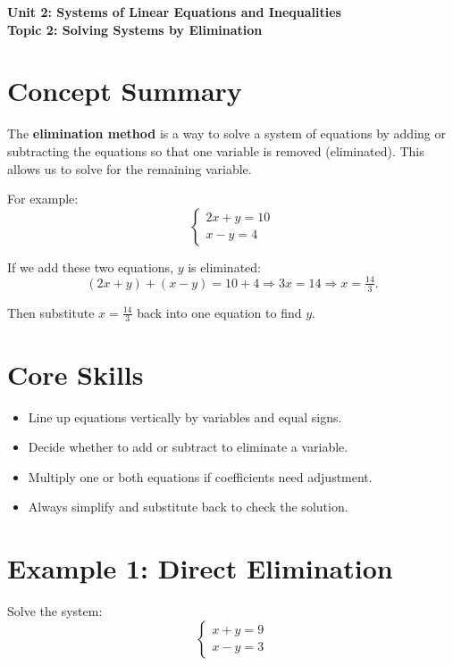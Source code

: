 \documentclass[14pt]{extarticle}
\begin{document}
\raggedright
{}

\begin{center}
    \LARGE \textbf{Unit 2: Systems of Linear Equations and Inequalities} \\[6pt]
    \Large \textbf{Topic 2: Solving Systems by Elimination}
\end{center}

\vspace{1em}

\section*{Concept Summary}

The \textbf{elimination method} is a way to solve a system of equations by adding or subtracting the equations so that one variable is removed (eliminated). This allows us to solve for the remaining variable.

For example:
\[
\begin{cases}
2x + y = 10 \\
x - y = 4
\end{cases}
\]

If we add these two equations, \(y\) is eliminated:
\[
(2x + y) + (x - y) = 10 + 4 \Rightarrow 3x = 14 \Rightarrow x = \tfrac{14}{3}.
\]

Then substitute \(x = \tfrac{14}{3}\) back into one equation to find \(y\).

\section*{Core Skills}
\begin{itemize}
    \item Line up equations vertically by variables and equal signs.
    \item Decide whether to add or subtract to eliminate a variable.
    \item Multiply one or both equations if coefficients need adjustment.
    \item Always simplify and substitute back to check the solution.
\end{itemize}

\section*{Example 1: Direct Elimination}

Solve the system:
\[
\begin{cases}
x + y = 9 \\
x - y = 3
\end{cases}
\]
\end{document}
